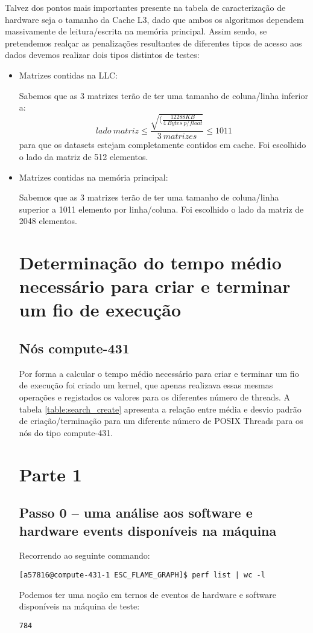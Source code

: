 \documentclass[conference,compsoc]{IEEEtran}
\begin{document}
Talvez dos pontos mais importantes presente na tabela de caracterização de hardware seja o tamanho da Cache L3, dado que ambos os algoritmos dependem massivamente de leitura/escrita na memória principal. Assim sendo, se pretendemos realçar as penalizações resultantes de diferentes tipos de acesso aos dados devemos realizar dois tipos distintos de testes:
\begin{itemize}
\item Matrizes contidas na LLC: \par Sabemos que as 3 matrizes terão de ter uma tamanho de coluna/linha inferior a: \[lado\ matriz \leq \frac{\sqrt{(\frac{12288KB}{4\ Bytes\ p/ float}}}{3\ matrizes} \leq 1011\] para que os datasets estejam completamente contidos em cache. Foi escolhido o lado da matriz de 512 elementos.
\item Matrizes contidas na memória principal: \par 
Sabemos que as 3 matrizes terão de ter uma tamanho de coluna/linha superior a 1011 elemento por linha/coluna. Foi escolhido o lado da matriz de 2048 elementos.

  \section{Determinação do tempo médio necessário para criar e  terminar um fio de execução}
  \subsection{Nós compute-431}
  Por forma a calcular o tempo médio necessário para criar e terminar um fio de execução foi criado um kernel, que apenas realizava essas mesmas operações e registados os valores para os diferentes número de threads. A tabela \ref{table:search_create} apresenta a relação entre média e desvio padrão de criação/terminação para um diferente número de POSIX Threads para os nós do tipo compute-431.

\section{Parte 1 }

\subsection{Passo 0 -- uma análise aos software e hardware events disponíveis na máquina}
Recorrendo ao seguinte commando:
 \begin{lstlisting}[style=command]
[a57816@compute-431-1 ESC_FLAME_GRAPH]$ perf list | wc -l   
\end{lstlisting}
Podemos ter uma noção em ternos de eventos de hardware e software disponíveis na máquina de teste:
\begin{lstlisting}
784
\end{lstlisting}
   

\end{itemize}
\end{document}
